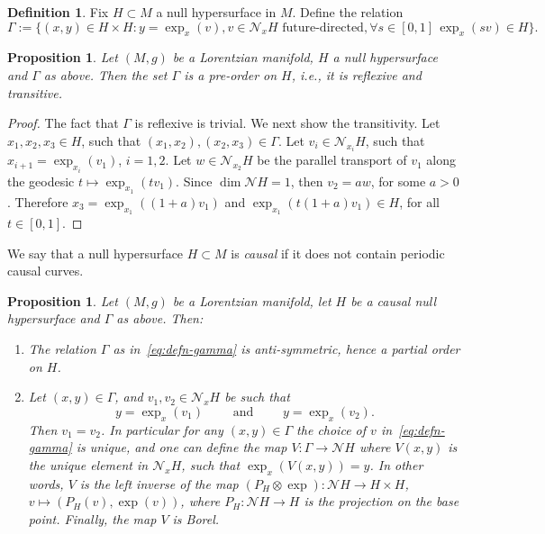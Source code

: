 \documentclass[12pt,a4paper]{amsart}
\theoremstyle{plain}
\newtheorem{proposition}[lemma]{Proposition}
\theoremstyle{definition}
\newtheorem{definition}[lemma]{Definition}
\numberwithin{equation}{section}
\newcommand{\normal}{\mathscr{N}}
\begin{document}
\begin{definition}\label{D:Transport Order}
Fix $H\subset M$ a null hypersurface in $M$.
%
Define the relation
\begin{equation}
  \label{eq:defn-gamma}
  \Gamma:=
  \{
  (x,y)\in H\times H:
  y=\exp_x(v), v\in\normal_xH
  \text{ future-directed},
  \forall s\in[0,1] \, \exp_x(sv)\in H 
  \}
  .
\end{equation}
\end{definition}

\begin{proposition}\label{prop:Gammapreorder}
Let $(M,g)$ be a Lorentzian manifold, 
$H$ a null hypersurface and $\Gamma$ as above.
Then the set $\Gamma$ is a pre-order on $H$, i.e., it is reflexive and
transitive.
\end{proposition}
\begin{proof}
  The fact that $\Gamma$ is reflexive is trivial. We next show the
  transitivity.
  Let $x_1,x_2,x_3\in H$, such that $(x_1,x_2), (x_2,x_3)\in\Gamma$.
  Let $v_i\in \normal_{x_{i}} H$, such that $x_{i+1}=\exp_{x_i}(v_1)$,
  $i=1,2$.
  Let $w\in \normal_{x_2}H$ be the parallel transport of $v_1$ along the geodesic
  $t\mapsto \exp_{x_1}(t v_1)$.
  Since $\dim \normal H =1$, then $v_2=a w$, for some $a>0$.
  Therefore $x_3=\exp_{x_1}((1+a)v_1)$ and $\exp_{x_1}(t(1+a)v_1)\in
  H$, for all $t\in[0,1]$.
\end{proof}
We say that a null hypersurface $H\subset M$ is  \emph{causal} if it does not contain periodic causal curves.

\begin{proposition}\label{prop:MapV}
Let $(M,g)$ be a Lorentzian manifold, let $H$ be a causal null
hypersurface and $\Gamma$ as above.
Then:
\begin{enumerate}
\item  The relation $\Gamma$ as in~\eqref{eq:defn-gamma} is anti-symmetric, hence a partial order  on $H$.

\item  Let $(x,y)\in\Gamma$, and $v_1,v_2\in\normal_x H$ be such that
$$
y=\exp_x(v_1)
    \qquad
    \text{ and }
    \qquad
    y=\exp_x(v_2).
$$
Then $v_1=v_2$.
In particular for any $(x,y)\in \Gamma$ the choice of $v$ in~\eqref{eq:defn-gamma}
is unique, and one can define the map
$V:\Gamma\to \normal H$ where $V(x,y)$ is the unique element in
$\normal_x H$, such that $\exp_x(V(x,y))=y$.
%
In other words, $V$ is the left inverse of the map $(P_H\otimes\exp):\normal
H\to H\times H$, $v\mapsto (P_H(v),\exp (v))$, where $P_H:\normal H\to H$
is the projection on the base point. Finally, the map $V$ is Borel.
  \end{enumerate}
\end{proposition}
\end{document}
